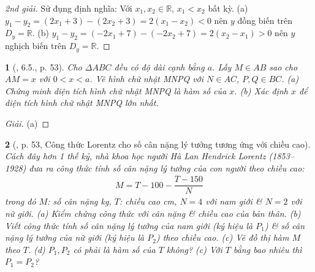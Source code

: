\documentclass{article}
\newtheorem{baitoan}{}
\begin{document}
\begin{proof}[2nd giải]
	Sử đụng định nghĩa: Với $x_1,x_2\in\mathbb{R}$, $x_1 < x_2$ bất kỳ. (a) $y_1 - y_2 = (2x_1 + 3) - (2x_2 + 3) = 2(x_1 - x_2) < 0$ nên $y$ đồng biến trên $D_y = \mathbb{R}$. (b) $y_1 - y_2 = (-2x_1 + 7) - (-2x_2 + 7) = 2(x_2 - x_1) > 0$ nên $y$ nghịch biến trên $D_y = \mathbb{R}$.
\end{proof}

\begin{baitoan}[\cite{Binh_boi_duong_Toan_9_tap_1}, 6.5., p. 53]
	Cho $\Delta ABC$ đều có độ dài cạnh bằng $a$. Lấy $M\in AB$ sao cho $AM = x$ với $0 < x < a$. Vẽ hình chữ nhật MNPQ với $N\in AC$, $P,Q\in BC$. (a) Chứng minh diện tích hình chữ nhật MNPQ là hàm số của $x$. (b) Xác định $x$ để diện tích hình chữ nhật MNPQ lớn nhất.
\end{baitoan}

\begin{center}
\end{center}

\begin{proof}[Giải]
	(a) 
\end{proof}

\begin{baitoan}[\cite{Binh_boi_duong_Toan_9_tap_1},  p. 53, Công thức Lorentz cho số cân nặng lý tưởng tương ứng với chiều cao]
	Cách đây hơn 1 thế kỷ, nhà khoa học người Hà Lan Hendrick Lorentz (1853--1928) đưa ra công thức tính số cân nặng lý tưởng của con người theo chiều cao:
	\begin{align*}
		\boxed{M = T - 100 - \dfrac{T - 150}{N}}
	\end{align*}
	trong đó $M$: số cân nặng {\rm kg}, $T$: chiều cao {\rm cm}, $N = 4$ với nam giới \& $N = 2$ với nữ giới. (a) Kiểm chứng công thức với cân nặng \& chiều cao của bản thân. (b) Viết công thức tính số cân nặng lý  tưởng của nam giới (ký hiệu là $P_1$) \& số cân nặng lý tưởng của nữ giới (ký hiệu là $P_2$) theo chiều cao. (c) Vẽ đồ thị hàm $M$ theo $T$. (d) $P_1,P_2$ có phải là hàm số của $T$ không? (c) Với $T$ bằng bao nhiêu thì $P_1 = P_2$?
\end{baitoan}
\end{document}
